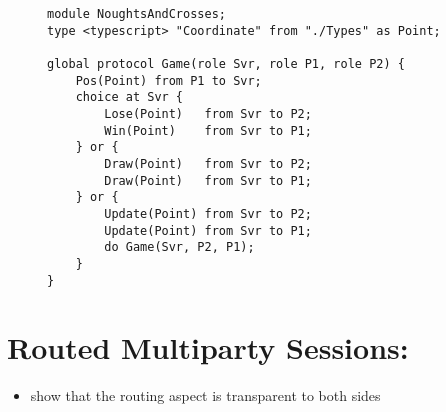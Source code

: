 \begin{figure}[!ht]
\begin{lstlisting}[language=Scribble, tabsize=2]
module NoughtsAndCrosses;
type <typescript> "Coordinate" from "./Types" as Point;

global protocol Game(role Svr, role P1, role P2) {
	Pos(Point) from P1 to Svr;
	choice at Svr {
		Lose(Point)   from Svr to P2;
		Win(Point)    from Svr to P1;
	} or {
		Draw(Point)   from Svr to P2;
		Draw(Point)   from Svr to P1;
	} or {
		Update(Point) from Svr to P2;
		Update(Point) from Svr to P1;
		do Game(Svr, P2, P1);
	}
}
\end{lstlisting}
\label{lst:game}
\end{figure}

\section{Routed Multiparty Sessions: }
\begin{itemize}
\item show that the routing aspect is transparent to both sides
\end{itemize}

